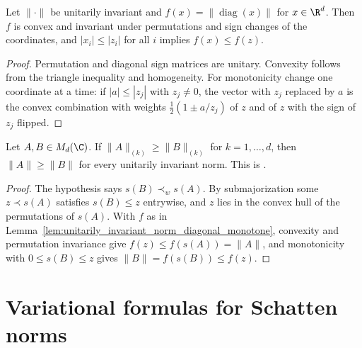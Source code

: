 \begin{lemma}
    \label{lem:unitarily_invariant_norm_diagonal_monotone}
    \leanok
    Let $\|\cdot\|$ be unitarily invariant and $f(x)=\|\operatorname{diag}(x)\|$
    for $x\in\R^d$. Then $f$ is convex and invariant under permutations and sign
    changes of the coordinates, and $|x_i|\le|z_i|$ for all $i$ implies
    $f(x)\le f(z)$.
\end{lemma}
\begin{proof}\leanok
    Permutation and diagonal sign matrices are unitary. Convexity follows from
    the triangle inequality and homogeneity. For monotonicity change one
    coordinate at a time: if $|a|\le|z_j|$ with $z_j\neq0$, the vector with
    $z_j$ replaced by $a$ is the convex combination with weights
    $\frac12(1\pm a/z_j)$ of $z$ and of $z$ with the sign of $z_j$ flipped.
\end{proof}

\begin{theorem}
    \label{thm:ky_fan_dominance}
    \leanok
    Let $A,B\in M_d(\C)$. If $\|A\|_{(k)}\ge\|B\|_{(k)}$ for $k=1,\ldots,d$, then
    $\|A\|\ge\|B\|$ for every unitarily invariant norm.
    This is \cite[Theorem~8.2(5)]{Wolf2012Quantum}.
\end{theorem}
\begin{proof}\leanok
    The hypothesis says $s(B)\prec_ws(A)$. By submajorization some $z\prec s(A)$
    satisfies $s(B)\le z$ entrywise, and $z$ lies in the convex hull of the
    permutations of $s(A)$. With $f$ as in
    Lemma~\ref{lem:unitarily_invariant_norm_diagonal_monotone}, convexity and
    permutation invariance give $f(z)\le f(s(A))=\|A\|$, and monotonicity with
    $0\le s(B)\le z$ gives $\|B\|=f(s(B))\le f(z)$.
\end{proof}

\section{Variational formulas for Schatten norms}


